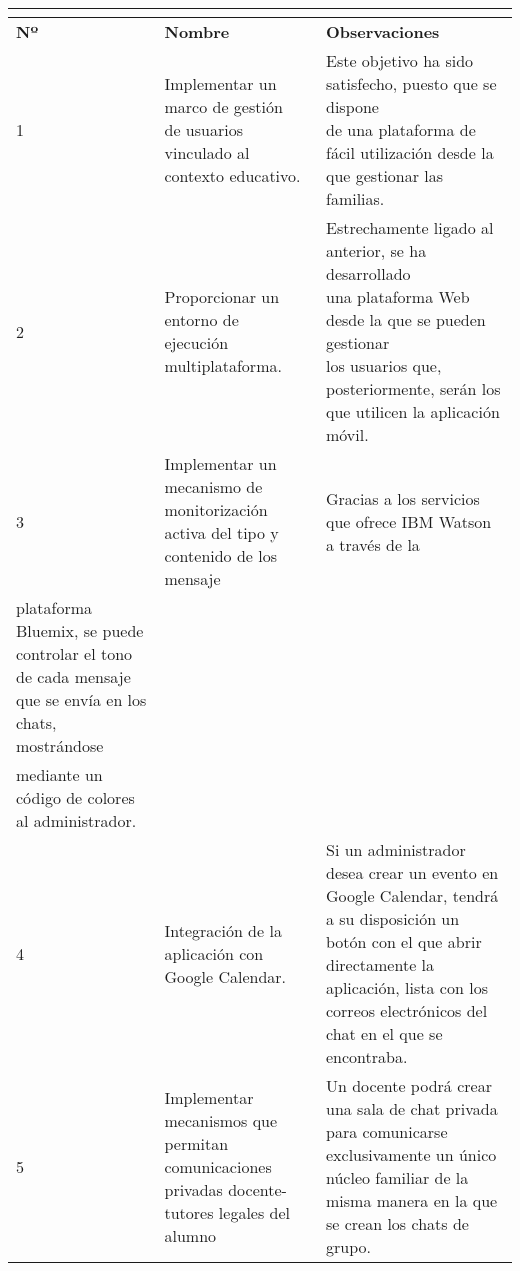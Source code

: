 \resizebox{15cm}{!} {
	\begin{tabular}{|l|l|l|}
		\hline
		\multicolumn{3}{|c|}{\cellcolor[HTML]{333333}{\color[HTML]{FFFFFF} \textbf{Desarrollo de los Objetivos}}}                             \\ \hline
		\textbf{Nº}        & \textbf{Nombre}       & \textbf{Observaciones} \\ \hline
		1           & \specialcell{Implementar un marco de gestión \\ de usuarios vinculado al contexto educativo.} & \specialcell{Este objetivo ha sido satisfecho, puesto que se dispone \\ de una plataforma de fácil utilización desde la que gestionar las familias.}                        \\ \hline
		2           & \specialcell{Proporcionar un entorno de \\ ejecución multiplataforma.} & \specialcell{Estrechamente ligado al anterior, se ha desarrollado \\ una plataforma Web desde la que se pueden gestionar \\ los usuarios que, posteriormente, serán los que utilicen la aplicación móvil.}                      \\ \hline
		3           & \specialcell{Implementar un mecanismo de monitorización \\ activa del tipo y contenido de los mensaje}          & Gracias a los servicios que ofrece IBM Watson a través de la \\ plataforma Bluemix, se puede controlar el tono de cada mensaje que se envía en los chats, mostrándose \\ mediante un código de colores al administrador.                       \\ \hline
		4           & Integración de la aplicación con Google Calendar.                                              & Si un administrador desea crear un evento en Google Calendar, tendrá a su disposición un botón con el que abrir directamente la aplicación, lista con los correos electrónicos del chat en el que se encontraba.                       \\ \hline
		5           & Implementar mecanismos que permitan comunicaciones privadas docente-tutores legales del alumno & Un docente podrá crear una sala de chat privada para comunicarse exclusivamente un único núcleo familiar de la misma manera en la que se crean los chats de grupo.                       \\ \hline
	\end{tabular}
}